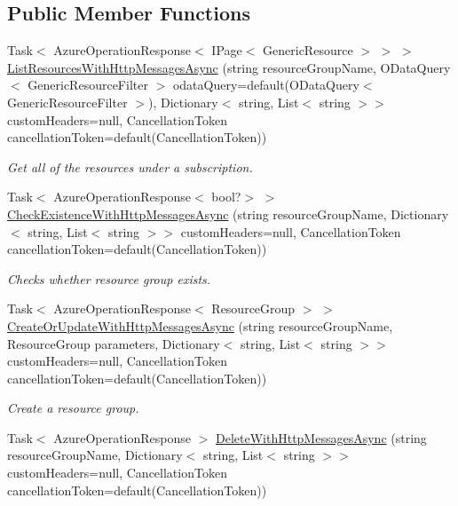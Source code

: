 \subsection*{Public Member Functions}
\begin{DoxyCompactItemize}
\item 
Task$<$ Azure\+Operation\+Response$<$ I\+Page$<$ Generic\+Resource $>$ $>$ $>$ \hyperlink{interface_microsoft_1_1_azure_1_1_management_1_1_resources_1_1_i_resource_groups_operations_a71b725a40dcd00275221c23881ca91fd}{List\+Resources\+With\+Http\+Messages\+Async} (string resource\+Group\+Name, O\+Data\+Query$<$ Generic\+Resource\+Filter $>$ odata\+Query=default(O\+Data\+Query$<$ Generic\+Resource\+Filter $>$), Dictionary$<$ string, List$<$ string $>$$>$ custom\+Headers=null, Cancellation\+Token cancellation\+Token=default(Cancellation\+Token))
\begin{DoxyCompactList}\small\item\em Get all of the resources under a subscription. \end{DoxyCompactList}\item 
Task$<$ Azure\+Operation\+Response$<$ bool?$>$ $>$ \hyperlink{interface_microsoft_1_1_azure_1_1_management_1_1_resources_1_1_i_resource_groups_operations_ae3a9d3f77df4c66138103a69a9e78669}{Check\+Existence\+With\+Http\+Messages\+Async} (string resource\+Group\+Name, Dictionary$<$ string, List$<$ string $>$$>$ custom\+Headers=null, Cancellation\+Token cancellation\+Token=default(Cancellation\+Token))
\begin{DoxyCompactList}\small\item\em Checks whether resource group exists. \end{DoxyCompactList}\item 
Task$<$ Azure\+Operation\+Response$<$ Resource\+Group $>$ $>$ \hyperlink{interface_microsoft_1_1_azure_1_1_management_1_1_resources_1_1_i_resource_groups_operations_ac340acabbaa0d0be9375232f896e32e6}{Create\+Or\+Update\+With\+Http\+Messages\+Async} (string resource\+Group\+Name, Resource\+Group parameters, Dictionary$<$ string, List$<$ string $>$$>$ custom\+Headers=null, Cancellation\+Token cancellation\+Token=default(Cancellation\+Token))
\begin{DoxyCompactList}\small\item\em Create a resource group. \end{DoxyCompactList}\item 
Task$<$ Azure\+Operation\+Response $>$ \hyperlink{interface_microsoft_1_1_azure_1_1_management_1_1_resources_1_1_i_resource_groups_operations_a4c201f1b6ef51cfeabf95037dc97c4d9}{Delete\+With\+Http\+Messages\+Async} (string resource\+Group\+Name, Dictionary$<$ string, List$<$ string $>$$>$ custom\+Headers=null, Cancellation\+Token cancellation\+Token=default(Cancellation\+Token))

\end{DoxyCompactItemize}
